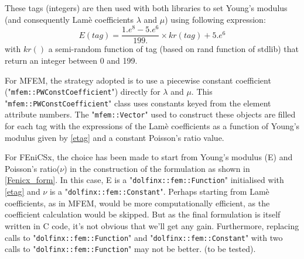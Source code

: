 \documentclass[12pt]{article}
\newcommand{\f}[1]{FEniCSx#1}
\newcommand{\mycode}[1]{\textsf{"}\lstinline`#1`\textsf{"}}
\begin{document}
These tags (integers) are then used with both libraries to set Young's modulus (and consequently Lamè coefficients $\lambda$ and $\mu$) using following expression:
\begin{equation}
	E(tag)=\frac{1.e^{8}-5.e^6}{199.}\times kr(tag)+5.e^6
\label{etag}
\end{equation}
with $kr()$ a semi-random function of tag (based on rand function of stdlib) that return an integer between 0 and 199.

For MFEM, the strategy adopted is to use a piecewise constant coefficient (\mycode{mfem::PWConstCoefficient}) directly for $\lambda$ and $\mu$. 
This \mycode{mfem::PWConstCoefficient} class uses constants keyed from the element attribute numbers. 
The \mycode{mfem::Vector} used to construct these objects are filled for each tag with the expressions of the Lamè coefficients as a function of Young's modulus given by \eqref{etag} and a constant Poisson's ratio value.

For \f{}, the choice has been made to start from Young's modulus (E) and Poisson's ratio($\nu$) in the construction of the formulation as shown in \ref{Fenicx_form}. In this case, E is a \mycode{dolfinx::fem::Function} initialised with \eqref{etag} and $\nu$ is a \mycode{dolfinx::fem::Constant}.
Perhaps starting from Lamè coefficients, as in MFEM, would be more computationally efficient, as the coefficient calculation would be skipped. But as the final formulation is itself written in C code, it's not obvious that we'll get any gain. Furthermore, replacing calls to  \mycode{dolfinx::fem::Function} and \mycode{dolfinx::fem::Constant} with two calls to  \mycode{dolfinx::fem::Function} may not be better.  (to be tested).  
\end{document}

